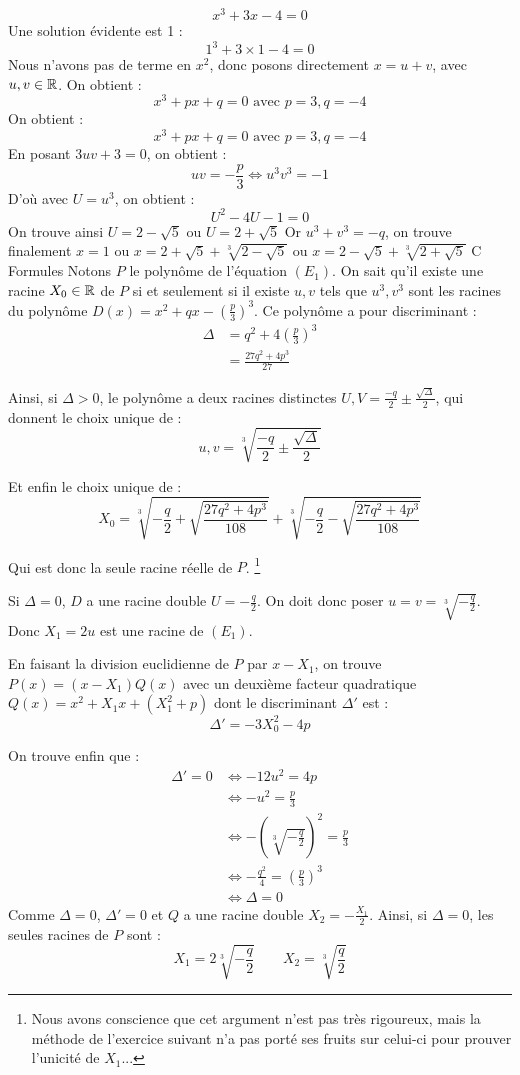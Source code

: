 \documentclass[]{../templates/homework}
\begin{document}
	$$ x^3 + 3x - 4 = 0$$
	\question Une solution évidente est 1 : $$1^3 + 3\times1 - 4 = 0$$
	\question Nous n'avons pas de terme en $x^2$, donc posons directement $x = u+v$, avec $u, v \in \mathbb R$.
	On obtient : $$x^3 + px + q = 0 \text{ avec } p=3, q=-4$$
	On obtient : $$x^3 + px + q = 0 \text{ avec } p=3, q=-4$$
	En posant $3uv + 3 = 0$, on obtient : $$uv = -\frac{p}{3} \iff u^3v^3 = -1$$
	D'où avec $U = u^3$, on obtient : $$U^2 -4U -1 =0$$
	On trouve ainsi $U = 2 - \sqrt{5}$ ou $U = 2 + \sqrt{5}$
	Or $u^3 + v^3 = -q$, on trouve finalement $x=1$ ou $x = 2 + \sqrt{5} + \sqrt[3]{2 - \sqrt{5}}$ ou $x = 2 - \sqrt{5} + \sqrt[3]{2 + \sqrt{5}}$
	\partie C {Formules}
	 Notons $P$ le polynôme de l'équation $(E_1)$. On sait qu'il existe une racine $X_0 \in \mathbb R$ de $P$ si et seulement si il existe $u,v$ tels que $u^3,v^3$ sont les racines du polynôme $D(x) = x^2 + qx - \left(\frac p 3\right)^3$.
	Ce polynôme a pour discriminant :
	\begin{align*}
		\Delta &= q^2 + 4\left(\frac p 3\right)^3 \\
		&=  \frac {27q^2 + 4p^3}{27}
	\end{align*}
	
	
	Ainsi, si $\Delta > 0$, le polynôme a deux racines distinctes $U,V = \frac {-q}{2} \pm \frac {\sqrt \Delta} {2}$, qui donnent le choix unique de :
	$$u,v = \sqrt[3]{\frac {-q}{2} \pm \frac {\sqrt \Delta} {2}}$$
	
	Et enfin le choix unique de :
	$$X_0 = \sqrt[3]{-\frac {q}{2} + \sqrt {\frac {27q^2 + 4p^3}{108}} } + \sqrt[3]{-\frac {q}{2} - \sqrt {\frac {27q^2 + 4p^3}{108}} }$$
	
	Qui est donc la seule racine réelle de $P$. \footnote{Nous avons conscience que cet argument n'est pas très rigoureux, mais la méthode de l'exercice suivant n'a pas porté ses fruits sur celui-ci pour prouver l'unicité de $X_1$...}
	
	\subproblem Si $\Delta = 0$, $D$ a une racine double $U = -\frac q {2}$. On doit donc poser $u = v = \sqrt[3]{-\frac q 2}$. Donc $X_1 = 2u$ est une racine de $(E_1)$.
	
	
	En faisant la division euclidienne de $P$ par $x-X_1$, on trouve $P(x) = (x-X_1)Q(x)$ avec un deuxième facteur quadratique $Q(x) = x^2 + X_1x + (X_1^2 + p)$ dont le discriminant $\Delta'$ est :
	$$\Delta' = -3X_0^2 - 4p$$
	
	On trouve enfin que :
	\begin{align*}
		\Delta' = 0 &\iff -12u^2 = 4p \\
		&\iff -u^2 = \frac p 3\\
		&\iff -(\sqrt[3]{-\frac q 2})^2 = \frac p3\\
		&\iff -\frac {q^2} 4 = (\frac p 3)^3\\
		&\iff \Delta = 0
	\end{align*}
	Comme $\Delta = 0$, $\Delta' = 0$ et $Q$ a une racine double $X_2 = -\frac {X_1} 2$.
	Ainsi, si $\Delta = 0$, les seules racines de $P$ sont :
	\begin{equation*}
		X_1 = 2\sqrt[3]{-\frac q 2} \qquad X_2 = \sqrt[3]{\frac q 2}
	\end{equation*}
\end{document}
